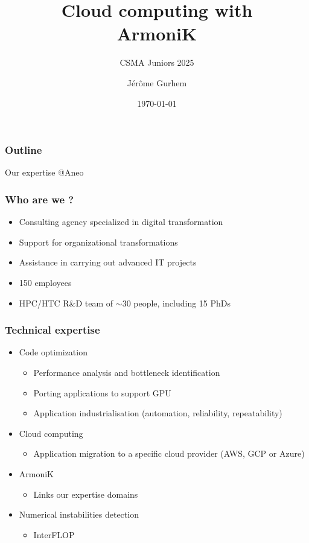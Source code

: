 \documentclass[10pt,aspectratio=1609]{beamer}
\begin{document}
\author{Jérôme Gurhem}
\title{Cloud computing with \\ ArmoniK}
\subtitle{CSMA Juniors 2025}
\date{\today}

\titlepage

\AtBeginSection[]
{
	\frame{\sectionpage}
}

\begin{frame}
	\frametitle{Outline}
	\large
	\tableofcontents
\end{frame}

\begin{section}{Our expertise @Aneo}
  \begin{frame}
    \frametitle{Who are we ?}
    \begin{itemize}
      \item Consulting agency specialized in digital transformation
      \item Support for organizational transformations
      \item Assistance in carrying out advanced IT projects
      \item 150 employees
      \item HPC/HTC R\&D team of $\sim$30 people, including 15 PhDs
    \end{itemize}
  \end{frame}

  \begin{frame}
    \frametitle{Technical expertise}
    \begin{itemize}
      \item Code optimization
      \begin{itemize}
        \item Performance analysis and bottleneck identification
        \item Porting applications to support GPU
        \item Application industrialisation (automation, reliability, repeatability)
      \end{itemize}
      \item Cloud computing
      \begin{itemize}
        \item Application migration to a specific cloud provider (AWS, GCP or Azure)
      \end{itemize}
      \item ArmoniK
      \begin{itemize}
        \item Links our expertise domains
      \end{itemize}
      \item Numerical instabilities detection
      \begin{itemize}
        \item InterFLOP
      \end{itemize}
    \end{itemize}
  \end{frame}


\end{section}
\end{document}
